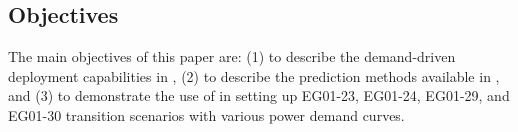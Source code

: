 \subsection{Objectives}
\label{sec:obj}
The main objectives of this paper are: 
(1) to describe the demand-driven deployment capabilities in 
\Cyclus, 
(2) to describe the prediction methods available in 
\deploy, and
(3) to demonstrate the use of \deploy in setting up 
EG01-23, EG01-24, EG01-29, and EG01-30 transition scenarios 
with various power demand curves.
